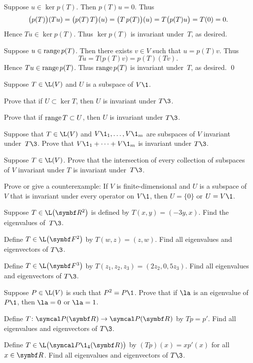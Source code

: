 \proof
Suppose $u \in \ker p(T)$. Then
$p(T)u = 0$.  Thus
\[
\bigl(p(T)\bigr)(Tu) = \paren[\big]{ p(T)\,T }(u) = \paren[\big]{ T\,p(T) }(u) =
T\bigl(p(T)u\bigr) = T(0) = 0.
\]
Hence $Tu \in \ker p(T)$.  Thus $\ker p(T)$ is invariant under~$T$, as
desired.

Suppose $u \in \ran p(T)$. Then there exists $v \in V$ such that $u = p(T)v$. Thus
\[
Tu = T\bigl(p(T)v\bigr) = p(T)(Tv).
\]
Hence $Tu \in \ran p(T)$.  Thus $\ran p(T)$ is invariant under~$T$, as
desired.
\qed

\begin{exercises}

\exercise
Suppose $T \in \L(V)$ and $U$ is a subspace of $V\1$.
\begin{subtheorem}
\item
Prove that if $U \subset \ker T$, then $U$ is invariant under $T\3$.
\item
Prove that if $\ran T \subset U$, then $U$ is invariant under $T\3$.
\end{subtheorem}
\exercisesubtheoremend


\exercise
Suppose that $T \in \L(V)$ and $V\1_1, \dots, V\1_m$ are subspaces of $V$
invariant under~$T\3$. Prove that $V\1_1 + \dots + V\1_m$ is invariant under $T\3$.


\exercise
Suppose $T \in \L(V)$.  Prove that the intersection of every collection of
subspaces of $V$ invariant under $T$ is invariant under~$T\3$.


\exercise
Prove or give a counterexample: If $V$ is finite-dimensional and $U$ is a subspace of $V$ that is invariant
under every operator on $V\1$, then $U = \{0\}$ or $U = V\1$.


\exercise
Suppose $T \in \L\paren[\big]{\R{2}}$ is defined by $T(x, y) = (-3y, x)$. Find the eigenvalues of~$T\3$.


\exercise
Define $T \in \L\paren[\big]{\F{2}}$ by
$
T(w, z) = (z, w)$.
Find all eigenvalues and eigenvectors of $T\3$.


\exercise
Define $T \in \L\paren[\big]{\F{3}}$ by
$
T(z_1, z_2, z_3) = (2 z_2, 0, 5z_3)$.
Find all eigenvalues and eigenvectors of $T\3$.


\exercise
Suppose $P \in \L(V)$ is such that $P^2 = P\1$. Prove that if $\la$ is an eigenvalue of~$P\1$, then $\la = 0$ or
$\la = 1$.\label{5P}


\exercise
Define $T \colon \P(\R{}) \to \P(\R{})$ by $Tp = p'\!$. Find all eigenvalues and eigenvectors of $T\3$.


\exercise
Define $T \in \L\bigl( \P\1_4(\R{}) \bigr)$ by
$
(Tp)(x) = x p' \! (x)
$
for all $x \in \R{}$. Find all eigenvalues and eigenvectors of $T\3$.



\end{exercises}
